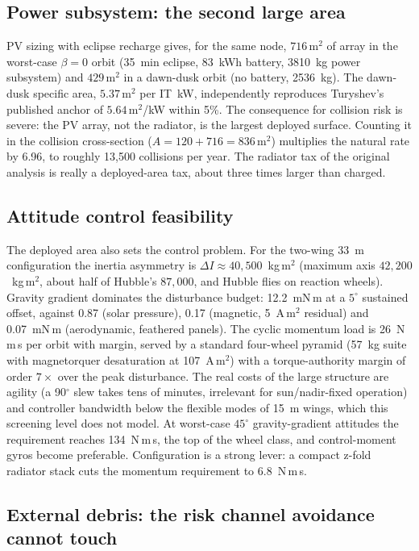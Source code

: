 \documentclass[11pt,a4paper]{article}
\begin{document}
\subsection{Power subsystem: the second large area}

PV sizing with eclipse recharge gives, for the same node, $716\,\mathrm{m}^2$ of
array in the worst-case $\beta = 0$ orbit (35~min eclipse, 83~kWh battery,
3810~kg power subsystem) and $429\,\mathrm{m}^2$ in a dawn-dusk orbit
(no battery, 2536~kg). The dawn-dusk specific area, $5.37\,\mathrm{m}^2$ per IT~kW,
independently reproduces Turyshev's published anchor of $5.64\,\mathrm{m}^2$/kW
within 5\%. The consequence for collision risk is severe: the PV array, not the
radiator, is the largest deployed surface. Counting it in the collision
cross-section ($A = 120 + 716 = 836\,\mathrm{m}^2$) multiplies the natural rate by
6.96, to roughly 13{,}500 collisions per year. The radiator tax of the original
analysis is really a deployed-area tax, about three times larger than charged.

\subsection{Attitude control feasibility}

The deployed area also sets the control problem. For the two-wing 33~m
configuration the inertia asymmetry is $\Delta I \approx 40{,}500$~kg\,m$^2$
(maximum axis $42{,}200$~kg\,m$^2$, about half of Hubble's $87{,}000$, and Hubble
flies on reaction wheels). Gravity gradient dominates the disturbance budget:
12.2~mN\,m at a $5^\circ$ sustained offset, against 0.87 (solar pressure), 0.17
(magnetic, 5~A\,m$^2$ residual) and 0.07~mN\,m (aerodynamic, feathered panels).
The cyclic momentum load is 26~N\,m\,s per orbit with margin, served by a standard
four-wheel pyramid (57~kg suite with magnetorquer desaturation at 107~A\,m$^2$)
with a torque-authority margin of order $7\times$ over the peak disturbance. The
real costs of the large structure are agility (a 90$^\circ$ slew takes tens of
minutes, irrelevant for sun/nadir-fixed operation) and controller bandwidth below
the flexible modes of 15~m wings, which this screening level does not model. At
worst-case $45^\circ$ gravity-gradient attitudes the requirement reaches
134~N\,m\,s, the top of the wheel class, and control-moment gyros become
preferable. Configuration is a strong lever: a compact z-fold radiator stack cuts
the momentum requirement to 6.8~N\,m\,s.

\subsection{External debris: the risk channel avoidance cannot touch}
\end{document}
